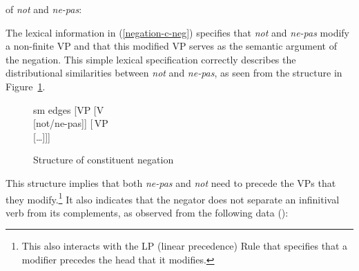 \documentclass[output=paper
 	        ,biblatex
                ,babelshorthands
                ,newtxmath
                ,draftmode
                ,colorlinks, citecolor=brown
]{langscibook}
\begin{document}
\begin{exe}
\begin{xlist}
\begin{exe}
\begin{xlist}
\ea
\label{negation-c-neg}
\localvs of \emph{not} and \emph{ne-pas}:\\
\z
{}

\noindent %
The lexical information in (\ref{negation-c-neg}) specifies that
\textit{not} and \textit{ne-pas} modify a non-finite VP and that this
modified VP serves as the semantic argument of the negation.
This simple lexical specification correctly describes the
distributional similarities between  \textit{not} and 
\textit{ne-pas}, as seen from the structure in Figure~\ref{negation-not-vp-mod}.

\begin{figure}
	\begin{forest}
		sm edges
		[VP
			[V\\
					[not/ne-pas]]
			[\,VP\\
					[\ldots]]]
	\end{forest}
\caption{Structure of constituent negation}\label{negation-not-vp-mod}
\end{figure}
\noindent
This structure implies that
both \textit{ne-pas} and \textit{not} need to precede the VPs that they modify.\footnote{
This also interacts with the LP (linear precedence) Rule that specifies
that a modifier precedes the head that it modifies.}  It also
indicates that the negator does not separate an infinitival verb
from its complements, as observed from the following data (\citealp[]{KS:02}):

\eal
{} \label{negation-35a}
 \label{negation-35b}
\zl


\end{xlist}
\end{exe}
\end{xlist}
\end{exe}
\end{document}

